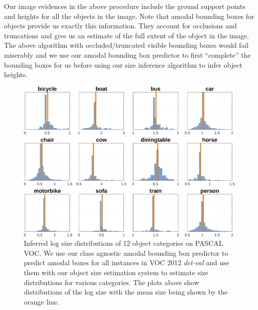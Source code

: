 Our image evidences in the above procedure include the ground support points and heights for all the objects in the image. Note that amodal bounding boxes for objects provide us exactly this information. They account for occlusions and truncations and give us an estimate of the full extent of the object in the image. The above algorithm with occluded/truncated visible bounding boxes would fail miserably and we use our amodal bounding box predictor to first ``complete'' the bounding boxes for us before using our size inference algorithm to infer object heights.

\begin{figure}
  \centering
  \includegraphics[width=\textwidth]{figures/amodal/size_PascalVal_pred.png}
  \caption{ Inferred log size distributions of 12 object categories on PASCAL VOC. We use our class agnostic amodal bounding box predictor to predict amodal boxes for all instances in VOC 2012 \textit{det-val} and use them with our object size estimation system to estimate size distributions for various categories. The plots above show distributions of the log size with the mean size being shown by the orange line.}
\end{figure}

